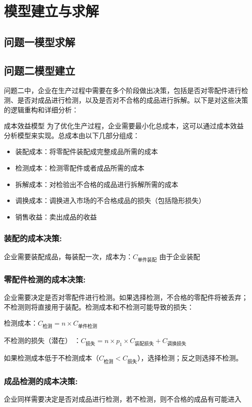 \documentclass[withoutpreface,bwprint]{cumcmthesis}
\begin{document}
\section{模型建立与求解}
\subsection{问题一模型求解}

\subsection{问题二模型建立}
问题二中，企业在生产过程中需要在多个阶段做出决策，包括是否对零配件进行检测、是否对成品进行检测，以及是否对不合格的成品进行拆解。以下是对这些决策的逻辑重构和详细分析：

成本效益模型
为了优化生产过程，企业需要最小化总成本，这可以通过成本效益分析模型来实现。总成本由以下几部分组成：
\begin{itemize}
    \item 装配成本：将零配件装配成完整成品所需的成本
    \item 检测成本：检测零配件或者成品所需的成本
    \item 拆解成本：对检验出不合格的成品进行拆解所需的成本
    \item 调换成本：调换进入市场的不合格成品的损失（包括隐形损失）
    \item 销售收益：卖出成品的收益
\end{itemize}

\subsubsection{装配的成本决策:}
企业需要装配成品，每装配一次，成本为：$C_{\text{单件装配}}$
由于企业装配

\subsubsection{零配件检测的成本决策:}
企业需要决定是否对零配件进行检测。如果选择检测，不合格的零配件将被丢弃；不检测则将直接用于装配。检测成本和不检测可能导致的损失：

检测成本：$C_{\text{检测}} = n \times C_{\text{单件检测}}$

不检测的损失（潜在） ：$C_{\text{损失}} = n \times p_1 \times C_{\text{装配损失}} + C_{\text{调换损失}}$

如果检测成本低于不检测成本（$C_{\text{检测}}<C_{\text{损失}}$），选择检测；反之则选择不检测。

\subsubsection{成品检测的成本决策:}
企业同样需要决定是否对成品进行检测，若不检测，则不合格的成品有可能进入
\end{document}
